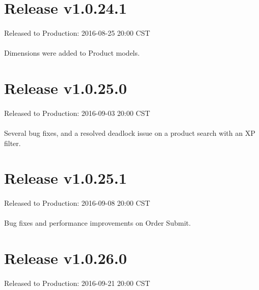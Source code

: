 \documentclass{memoir}%
\begin{document}
%
\section*{Release v1.0.24.1}%
\paragraph*{}%
Released to Production: 2016{-}08{-}25 20:00 CST

%
\paragraph*{}%
Dimensions were added to Product models.

%
\section*{Release v1.0.25.0}%
\paragraph*{}%
Released to Production: 2016{-}09{-}03 20:00 CST

%
\paragraph*{}%
Several bug fixes, and a resolved deadlock issue on a product search with an XP filter.

%
\section*{Release v1.0.25.1}%
\paragraph*{}%
Released to Production: 2016{-}09{-}08 20:00 CST

%
\paragraph*{}%
Bug fixes and performance improvements on Order Submit.

%
\section*{Release v1.0.26.0}%
\paragraph*{}%
Released to Production: 2016{-}09{-}21 20:00 CST
\end{document}
